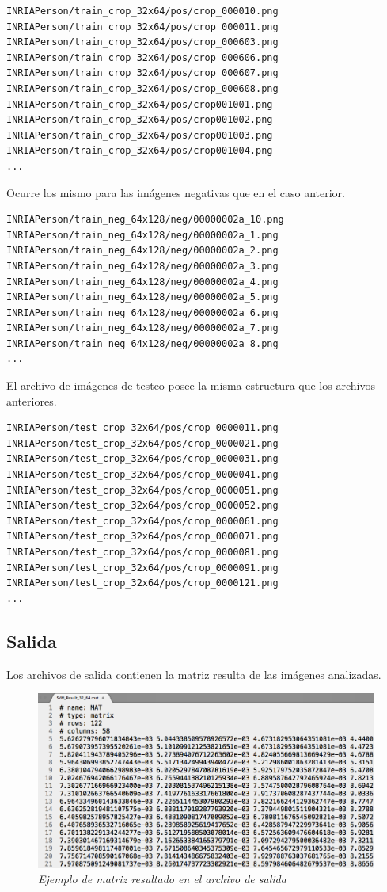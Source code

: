 \begin{lstlisting}
INRIAPerson/train_crop_32x64/pos/crop_000010.png
INRIAPerson/train_crop_32x64/pos/crop_000011.png
INRIAPerson/train_crop_32x64/pos/crop_000603.png
INRIAPerson/train_crop_32x64/pos/crop_000606.png
INRIAPerson/train_crop_32x64/pos/crop_000607.png
INRIAPerson/train_crop_32x64/pos/crop_000608.png
INRIAPerson/train_crop_32x64/pos/crop001001.png
INRIAPerson/train_crop_32x64/pos/crop001002.png
INRIAPerson/train_crop_32x64/pos/crop001003.png
INRIAPerson/train_crop_32x64/pos/crop001004.png
...
\end{lstlisting}


Ocurre los mismo para las imágenes negativas que en el caso anterior.

\begin{lstlisting}
INRIAPerson/train_neg_64x128/neg/00000002a_10.png
INRIAPerson/train_neg_64x128/neg/00000002a_1.png
INRIAPerson/train_neg_64x128/neg/00000002a_2.png
INRIAPerson/train_neg_64x128/neg/00000002a_3.png
INRIAPerson/train_neg_64x128/neg/00000002a_4.png
INRIAPerson/train_neg_64x128/neg/00000002a_5.png
INRIAPerson/train_neg_64x128/neg/00000002a_6.png
INRIAPerson/train_neg_64x128/neg/00000002a_7.png
INRIAPerson/train_neg_64x128/neg/00000002a_8.png
...
\end{lstlisting}


El archivo de imágenes de testeo posee la misma estructura que los archivos anteriores.

\begin{lstlisting}
INRIAPerson/test_crop_32x64/pos/crop_0000011.png
INRIAPerson/test_crop_32x64/pos/crop_0000021.png
INRIAPerson/test_crop_32x64/pos/crop_0000031.png
INRIAPerson/test_crop_32x64/pos/crop_0000041.png
INRIAPerson/test_crop_32x64/pos/crop_0000051.png
INRIAPerson/test_crop_32x64/pos/crop_0000052.png
INRIAPerson/test_crop_32x64/pos/crop_0000061.png
INRIAPerson/test_crop_32x64/pos/crop_0000071.png
INRIAPerson/test_crop_32x64/pos/crop_0000081.png
INRIAPerson/test_crop_32x64/pos/crop_0000091.png
INRIAPerson/test_crop_32x64/pos/crop_0000121.png
...
\end{lstlisting}

\subsection{Salida}

Los archivos de salida contienen la matriz resulta de las imágenes analizadas.

\begin{figure}[H]
  \centering
  \includegraphics[scale=.4]{images/salida}
  \caption{\em Ejemplo de matriz resultado en el archivo de salida}     
  \label{fig:salida}
\end{figure}

